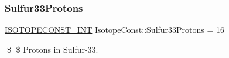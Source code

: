 \subsubsection{\texorpdfstring{Sulfur33\+Protons}{Sulfur33Protons}}
{\footnotesize\ttfamily \mbox{\hyperlink{group___isotope_const-_macros_ga5f18360b3e99483a35c32d789e62621c}{I\+S\+O\+T\+O\+P\+E\+C\+O\+N\+S\+T\+\_\+\+I\+NT}} Isotope\+Const\+::\+Sulfur33\+Protons = 16}

\$ \$ Protons in Sulfur-\/33. 